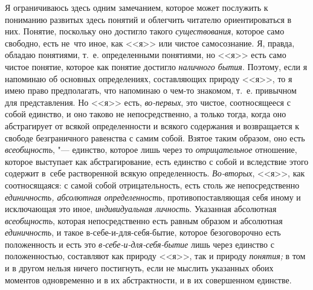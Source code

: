 Я ограничиваюсь здесь одним замечанием, которое может послужить к пониманию
развитых здесь понятий и облегчить читателю ориентироваться в них. Понятие,
поскольку оно достигло такого {\em существования}, которое само свободно,
есть не~что иное, как <<я>> или чистое самосознание. Я, правда, обладаю
понятиями, т.~е. определенными понятиями, но <<я>> есть само чистое понятие,
которое как понятие достигло {\em наличного бытия}. Поэтому, если я напоминаю
об основных определениях, составляющих природу <<я>>, то я имею право
предполагать, что напоминаю о чем-то знакомом, т.~е. привычном для
представления. Но <<я>> есть, {\em во-первых}, это чистое, соотносящееся с собой
единство, и оно таково не непосредственно, а только тогда, когда оно
абстрагирует от всякой определенности и всякого содержания и возвращается к
свободе безграничного равенства с самим собой. Взятое таким образом, оно
есть {\em всеобщность}, "--- единство, которое лишь через то {\em отрицательное}
отношение, которое выступает как абстрагирование, есть единство с собой и
вследствие этого содержит в~себе растворенной всякую определенность.
{\em Во-вторых}, <<я>>, как соотносящаяся: с самой собой отрицательность, есть
столь же непосредственно {\em единичность, абсолютная определенность},
противопоставляющая себя иному и исключающая это иное, {\em индивидуальная
личность}. Указанная абсолютная {\em всеобщность}, которая непосредственно есть
равным образом и абсолютная {\em единичность}, и такое в-себе-и-для-себя-бытие,
которое безоговорочно есть положенность и есть это
{\em в-себе-и-для-себя-бытие} лишь через единство с положенностью, составляют
как природу <<я>>, так и природу {\em понятия;} в том и в другом нельзя ничего
постигнуть, если не мыслить указанных обоих моментов одновременно и в их
абстрактности, и в их совершенном единстве.

